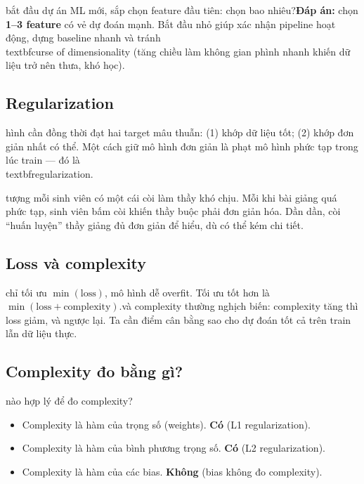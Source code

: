 \documentclass[12pt,a4paper]{article}
\begin{document}
\begin{luuy}[title={Bài tập: chọn bao nhiêu feature lúc bắt đầu?}] bắt đầu dự án ML mới, sắp chọn feature đầu tiên: chọn bao nhiêu?\n\n\textbf{Đáp án:} chọn \textbf{1--3 feature} có vẻ dự đoán mạnh. Bắt đầu nhỏ giúp xác nhận pipeline hoạt động, dựng baseline nhanh và tránh \\textbf{curse of dimensionality} (tăng chiều làm không gian phình nhanh khiến dữ liệu trở nên thưa, khó học).\n\end{luuy}

\subsection{Regularization}

\begin{dinhnghia}[title={Regularization}] hình cần đồng thời đạt hai target mâu thuẫn: (1) khớp dữ liệu tốt; (2) khớp đơn giản nhất có thể. Một cách giữ mô hình đơn giản là phạt mô hình phức tạp trong lúc train --- đó là \\textbf{regularization}.\n\end{dinhnghia}

\begin{vidu}[title={Ẩn dụ cái còi báo ồn}] tượng mỗi sinh viên có một cái còi làm thầy khó chịu. Mỗi khi bài giảng quá phức tạp, sinh viên bấm còi khiến thầy buộc phải đơn giản hóa. Dần dần, còi ``huấn luyện'' thầy giảng đủ đơn giản để hiểu, dù có thể kém chi tiết.\n\end{vidu}

\subsection{Loss và complexity}

\begin{ynghia} chỉ tối ưu \(\min(\text{loss})\), mô hình dễ overfit. Tối ưu tốt hơn là \(\min(\text{loss} + \text{complexity})\).\n\nLoss và complexity thường nghịch biến: complexity tăng thì loss giảm, và ngược lại. Ta cần điểm cân bằng sao cho dự đoán tốt cả trên train lẫn dữ liệu thực.\n\end{ynghia}

\subsection{Complexity đo bằng gì?}

\begin{luuy}[title={Bài tập: complexity metric hợp lý?}] nào hợp lý để đo complexity?\n\begin{itemize}\n  \item Complexity là hàm của trọng số (weights). \textbf{Có} (L1 regularization).\n  \item Complexity là hàm của bình phương trọng số. \textbf{Có} (L2 regularization).\n  \item Complexity là hàm của các bias. \textbf{Không} (bias không đo complexity).\n\end{itemize}\n\end{luuy}
\end{document}
